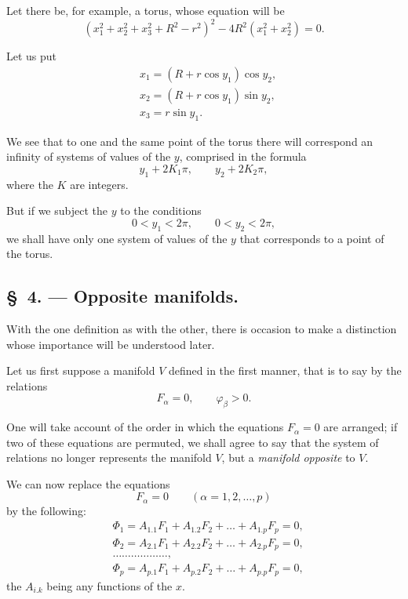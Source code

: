 \documentclass{article}
\begin{document}
Let there be, for example, a torus, whose equation will be
\[
(x^{2}_{1} + x^{2}_{2} + x^{2}_{3} + R^{2} - r^{2})^{2} - 4R^{2}(x^{2}_{1} + x^{2}_{2}) = 0.
\]

Let us put
\[
\begin{aligned}
&x_{1} = (R + r\cos y_{1})\cos y_{2},\\
&x_{2} = (R + r\cos y_{1})\sin y_{2},\\
&x_{3} = r\sin y_{1}.
\end{aligned}
\]

We see that to one and the same point of the torus there will correspond an infinity of systems of values of the $y$, comprised in the formula
\[
y_{1} + 2K_{1}\pi, \qquad y_{2} + 2K_{2}\pi,
\]
where the $K$ are integers.

But if we subject the $y$ to the conditions
\[
0 < y_{1} < 2\pi, \qquad 0 < y_{2} < 2\pi,
\]
we shall have only one system of values of the $y$ that corresponds to a point of the torus.

\subsection*{\S~4. --- Opposite manifolds.}

With the one definition as with the other, there is occasion to make a distinction whose importance will be understood later.

Let us first suppose a manifold $V$ defined in the first manner, that is to say by the relations
\[
F_{\alpha} = 0, \qquad \varphi_{\beta} > 0.
\]

One will take account of the order in which the equations $F_{\alpha} = 0$ are arranged; if two of these equations are permuted, we shall agree to say
that the system of relations no longer represents the manifold $V$, but a \emph{manifold opposite} to $V$.

We can now replace the equations
\[
F_{\alpha} = 0 \qquad (\alpha = 1, 2, \ldots, p)
\]
by the following:
\[
\begin{aligned}
&\Phi_{1} = A_{1.1}F_{1} + A_{1.2}F_{2} + \ldots + A_{1.p}F_{p} = 0,\\
&\Phi_{2} = A_{2.1}F_{1} + A_{2.2}F_{2} + \ldots + A_{2.p}F_{p} = 0,\\
&\ldots\ldots\ldots\ldots\ldots\ldots,\\
&\Phi_{p} = A_{p.1}F_{1} + A_{p.2}F_{2} + \ldots + A_{p.p}F_{p} = 0,
\end{aligned}
\]
the $A_{i.k}$ being any functions of the $x$.
\end{document}

